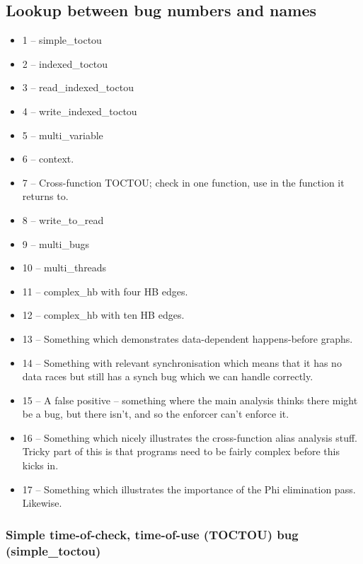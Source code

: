 \subsection{Lookup between bug numbers and names}

\begin{itemize}
\item 1 -- simple\_toctou
\item 2 -- indexed\_toctou
\item 3 -- read\_indexed\_toctou
\item 4 -- write\_indexed\_toctou
\item 5 -- multi\_variable
\item 6 -- context.
\item 7 -- Cross-function TOCTOU; check in one function, use in the
  function it returns to.
\item 8 -- write\_to\_read
\item 9 -- multi\_bugs
\item 10 -- multi\_threads
\item 11 -- complex\_hb with four HB edges.
\item 12 -- complex\_hb with ten HB edges.
\item 13 -- Something which demonstrates data-dependent happens-before
  graphs.
\item 14 -- Something with relevant synchronisation which means that
  it has no data races but still has a synch bug which we can handle
  correctly.
\item 15 -- A false positive -- something where the main analysis
  thinks there might be a bug, but there isn't, and so the enforcer
  can't enforce it.
\item 16 -- Something which nicely illustrates the cross-function
  alias analysis stuff.  Tricky part of this is that programs need to
  be fairly complex before this kicks in.
\item 17 -- Something which illustrates the importance of the Phi
  elimination pass.  Likewise.
\end{itemize}

\subsubsection{Simple time-of-check, time-of-use (TOCTOU) bug (simple\_toctou)}
\label{sect:eval:art:simple_toctou}


